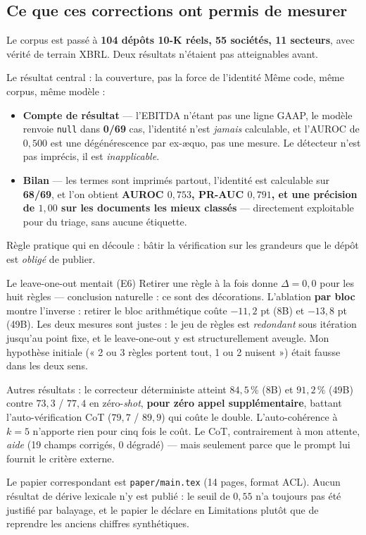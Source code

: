 \documentclass[11pt,a4paper]{article}
\newcommand{\fic}[1]{\texttt{\small #1}}
\begin{document}
\subsection*{Ce que ces corrections ont permis de mesurer}

Le corpus est passé à \textbf{104 dépôts 10-K réels, 55 sociétés, 11 secteurs}, avec
vérité de terrain XBRL. Deux résultats n'étaient pas atteignables avant.

\begin{bon}{Le résultat central : la couverture, pas la force de l'identité}
Même code, même corpus, même modèle :
\begin{itemize}[leftmargin=*, itemsep=1pt]
\item \textbf{Compte de résultat} --- l'EBITDA n'étant pas une ligne GAAP, le modèle
renvoie \fic{null} dans \textbf{0/69} cas, l'identité n'est \emph{jamais} calculable,
et l'AUROC de $0{,}500$ est une dégénérescence par ex-æquo, pas une mesure. Le
détecteur n'est pas imprécis, il est \emph{inapplicable}.
\item \textbf{Bilan} --- les termes sont imprimés partout, l'identité est calculable
sur \textbf{68/69}, et l'on obtient \textbf{AUROC $0{,}753$, PR-AUC $0{,}791$, et une
précision de $1{,}00$ sur les documents les mieux classés} --- directement exploitable
pour du triage, sans aucune étiquette.
\end{itemize}
Règle pratique qui en découle : bâtir la vérification sur les grandeurs que le dépôt
est \emph{obligé} de publier.
\end{bon}

\begin{bon}{Le leave-one-out mentait (E6)}
Retirer une règle à la fois donne $\Delta = 0{,}0$ pour les huit règles --- conclusion
naturelle : ce sont des décorations. L'ablation \textbf{par bloc} montre l'inverse :
retirer le bloc arithmétique coûte $-11{,}2$ pt (8B) et $-13{,}8$ pt (49B). Les deux
mesures sont justes : le jeu de règles est \emph{redondant} sous itération jusqu'au
point fixe, et le leave-one-out y est structurellement aveugle. Mon hypothèse initiale
(« 2 ou 3 règles portent tout, 1 ou 2 nuisent ») était fausse dans les deux sens.
\end{bon}

\noindent
Autres résultats : le correcteur déterministe atteint $84{,}5\,\%$ (8B) et
$91{,}2\,\%$ (49B) contre $73{,}3$ / $77{,}4$ en zéro-\textit{shot}, \textbf{pour zéro
appel supplémentaire}, battant l'auto-vérification CoT ($79{,}7$ / $89{,}9$) qui coûte
le double. L'auto-cohérence à $k{=}5$ n'apporte rien pour cinq fois le coût. Le CoT,
contrairement à mon attente, \emph{aide} (19 champs corrigés, 0 dégradé) --- mais
seulement parce que le prompt lui fournit le critère externe.

Le papier correspondant est \fic{paper/main.tex} (14 pages, format ACL). Aucun
résultat de dérive lexicale n'y est publié : le seuil de $0{,}55$ n'a toujours pas été
justifié par balayage, et le papier le déclare en Limitations plutôt que de reprendre
les anciens chiffres synthétiques.
\end{document}
